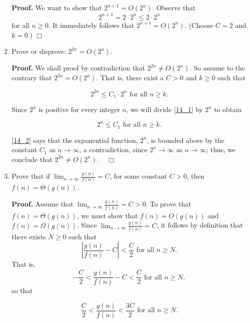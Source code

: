 \documentclass[9pt]{article}
\newcommand{\qed}{\hfill \ensuremath{\Box}}
\begin{document}
\begin{enumerate}
      \textbf{Proof.} We want to show that $2^{n+1} = O(2^n)$. Observe that
      $$2^{n+1} = 2 \cdot 2^n \le 2 \cdot 2^n$$
      for all $n \ge 0$. It immediately follows that $2^{n+1} = O(2^n)$.
      (Choose $C = 2$ and $k = 0$.) \qed
   \item Prove or disprove: $2^{2n} = O(2^n)$.

      \textbf{Proof.} We shall proof by contradiction that $2^{2n} \neq O(2^n)$.
      So assume to the contrary that $2^{2n} = O(2^n)$. That is, there exist a
      $C > 0$ and $k \ge 0$ such that

      \begin{equation} \label{14_1}
         2^{2n} \le C_1 \cdot 2^n \text{ for all } n \ge k.
      \end{equation}

      Since $2^n$ is positive for every integer $n$, we will divide \eqref{14_1}
      by $2^n$ to obtain

      \begin{equation} \label{14_2}
         2^n \le C_1 \text{ for all } n \ge k.
      \end{equation}

      \eqref{14_2} says that the exponential function, $2^n$, is bounded above
      by the constant $C_1$ as $n \rightarrow \infty$, a contradiction, since
      $2^n \rightarrow \infty$ as $n \rightarrow \infty$; thus, we conclude that
      $2^{2n} \neq O(2^n)$. \mbox{ } \qed
   \item Prove that if $\lim_{n\rightarrow\infty}\frac{g(n)}{f(n)} = C$, for
         some constant $C > 0$, then $f(n) = \Theta(g(n))$.

      \textbf{Proof.} Assume that
      $\lim_{n\rightarrow\infty}\frac{g(n)}{f(n)} = C > 0$. To prove that
      $f(n) = \Theta(g(n))$, we must show that $f(n) = O(g(n))$ and
      $f(n) = \Omega(g(n))$. Since
      $\lim_{n\rightarrow\infty}\frac{g(n)}{f(n)} = C$, it follows by definition
      that there exists $N \ge 0$ such that
      $$\left|\frac{g(n)}{f(n)} - C\right| < \frac{C}{2} \text{ for all }
         n \ge N.$$
      That is,
      $$-\frac{C}{2} < \frac{g(n)}{f(n)} - C < \frac{C}{2} \text{ for all }
         n \ge N,$$
      so that

      \begin{equation} \label{15_1}
         \frac{C}{2} < \frac{g(n)}{f(n)} < \frac{3C}{2} \text{ for all }n \ge N.
      \end{equation}


\end{enumerate}
\end{document}
